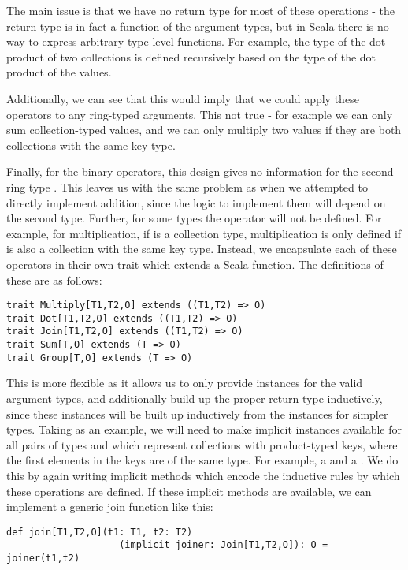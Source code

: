 The main issue is that we have no return type for most of these operations - the return type is in fact a function of the argument types, but in Scala there is no way to express arbitrary type-level functions. For example, the  type of the dot product of two collections is defined recursively based on the type of the dot product of the values.

Additionally, we can see that this would imply that we could apply these operators to any ring-typed arguments. This not true - for example we can only sum collection-typed values, and we can only multiply two values if they are both collections with the same key type.

Finally, for the binary operators, this design gives no information for the second ring type . This leaves us with the same problem as when we attempted to directly implement addition, since the logic to implement them will depend on the second type. Further, for some types the operator will not be defined. For example, for multiplication, if  is a collection type, multiplication is only defined if  is also a collection with the same key type.
\vs Instead, we encapsulate each of these operators in their own trait which extends a Scala function. The definitions of these are as follows:
\vs\begin{lstlisting}
trait Multiply[T1,T2,O] extends ((T1,T2) => O)
trait Dot[T1,T2,O] extends ((T1,T2) => O)
trait Join[T1,T2,O] extends ((T1,T2) => O)
trait Sum[T,O] extends (T => O)
trait Group[T,O] extends (T => O)
\end{lstlisting}\vs
This is more flexible as it allows us to only provide instances for the valid argument types, and additionally build up the proper return type inductively, since these instances will be built up inductively from the instances for simpler types.
Taking  as an example, we will need to make implicit instances available for all pairs of types  and  which represent collections with product-typed keys, where the first elements in the keys are of the same type. For example, a  and a . We do this by again writing implicit methods which encode the inductive rules by which these operations are defined. If these implicit methods are available, we can implement a generic join function like this:
\vs\begin{lstlisting}
def join[T1,T2,O](t1: T1, t2: T2)
                    (implicit joiner: Join[T1,T2,O]): O = joiner(t1,t2)
\end{lstlisting}\vs
